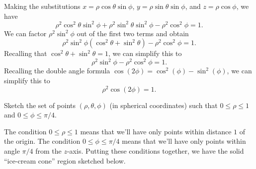 \documentclass{ximera}
\begin{document}
\begin{example}
Making the substitutions $x = \rho\cos\theta\sin\phi$, $y = \rho\sin\theta\sin\phi$, and $z = \rho\cos\phi$, we have
\[
\rho^2\cos^2\theta\sin^2\phi + \rho^2\sin^2\theta\sin^2\phi - \rho^2\cos^2\phi = 1.
\]
We can factor $\rho^2\sin^2\phi$ out of the first two terms and obtain
\[
\rho^2\sin^2\phi (\cos^2\theta+ \sin^2\theta) - \rho^2\cos^2\phi = 1.
\]
Recalling that $\cos^2\theta+ \sin^2\theta = 1$, we can simplify this to
\[
\rho^2\sin^2\phi  - \rho^2\cos^2\phi = 1.
\]
Recalling the double angle formula $\cos(2\phi) = \cos^2(\phi) - \sin^2(\phi)$, we can simplify this to
\[
\rho^2\cos(2\phi) = 1.
\]
\end{example}

\begin{example}
Sketch the set of points $(\rho,\theta,\phi)$ (in spherical coordinates) such that $0\leq \rho\leq 1$ and $0\leq\phi\leq\pi/4$.

The condition $0\leq \rho\leq 1$ means that we'll have only points within distance $1$ of the origin. The condition $0\leq\phi\leq\pi/4$ means that we'll have only points within angle $\pi/4$ from the $z$-axis. Putting these conditions together, we have the solid ``ice-cream cone'' region sketched below.

\begin{image}
\end{image}

\end{example}
\end{document}
